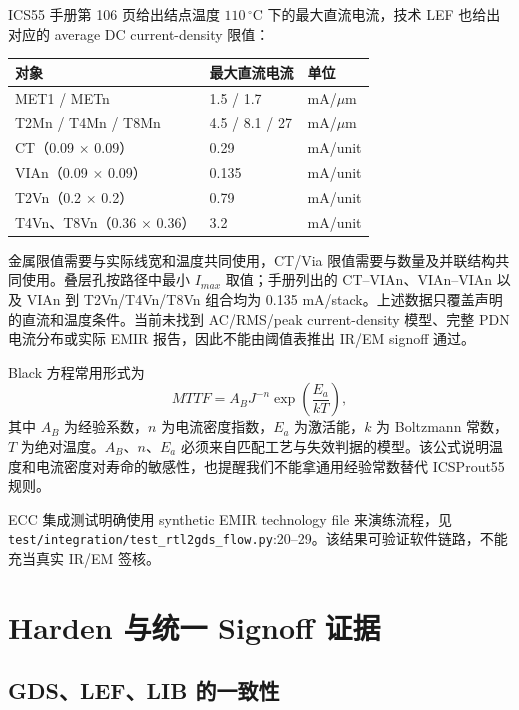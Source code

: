 \documentclass[UTF8,a4paper,11pt,fontset=fandol]{ctexart}
\numberwithin{equation}{section}
\newcommand{\code}[1]{\nolinkurl{#1}}
\begin{document}
ICS55 手册第 106 页给出结点温度 $110\,^{\circ}\mathrm{C}$ 下的最大直流电流，技术 LEF 也给出对应的 average DC current-density 限值\cite{pdkrules}：
\begin{center}
\small
\begin{tabular}{lll}
\toprule
对象 & 最大直流电流 & 单位 \\
\midrule
MET1 / METn & 1.5 / 1.7 & mA/$\mu$m \\
T2Mn / T4Mn / T8Mn & 4.5 / 8.1 / 27 & mA/$\mu$m \\
CT（0.09 $\times$ 0.09） & 0.29 & mA/unit \\
VIAn（0.09 $\times$ 0.09） & 0.135 & mA/unit \\
T2Vn（0.2 $\times$ 0.2） & 0.79 & mA/unit \\
T4Vn、T8Vn（0.36 $\times$ 0.36） & 3.2 & mA/unit \\
\bottomrule
\end{tabular}
\end{center}
金属限值需要与实际线宽和温度共同使用，CT/Via 限值需要与数量及并联结构共同使用。叠层孔按路径中最小 $I_{max}$ 取值；手册列出的 CT--VIAn、VIAn--VIAn 以及 VIAn 到 T2Vn/T4Vn/T8Vn 组合均为 0.135 mA/stack。上述数据只覆盖声明的直流和温度条件。当前未找到 AC/RMS/peak current-density 模型、完整 PDN 电流分布或实际 EMIR 报告，因此不能由阈值表推出 IR/EM signoff 通过。

Black 方程常用形式为\cite{black}
\begin{equation}
MTTF=A_BJ^{-n}\exp\!\left(\frac{E_a}{kT}\right),
\end{equation}
其中 $A_B$ 为经验系数，$n$ 为电流密度指数，$E_a$ 为激活能，$k$ 为 Boltzmann 常数，$T$ 为绝对温度。$A_B$、$n$、$E_a$ 必须来自匹配工艺与失效判据的模型。该公式说明温度和电流密度对寿命的敏感性，也提醒我们不能拿通用经验常数替代 ICSProut55 规则。

ECC 集成测试明确使用 synthetic EMIR technology file 来演练流程，见 \code{test/integration/test_rtl2gds_flow.py}:20--29。该结果可验证软件链路，不能充当真实 IR/EM 签核。

\section{Harden 与统一 Signoff 证据}

\subsection{GDS、LEF、LIB 的一致性}
\end{document}
